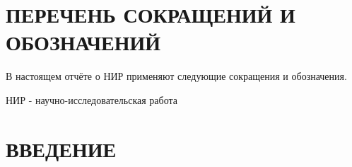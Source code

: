 \section*{ПЕРЕЧЕНЬ СОКРАЩЕНИЙ И ОБОЗНАЧЕНИЙ}

В настоящем отчёте о НИР применяют следующие сокращения и обозначения.

НИР - научно-исследовательская работа %

\section*{ВВЕДЕНИЕ}

